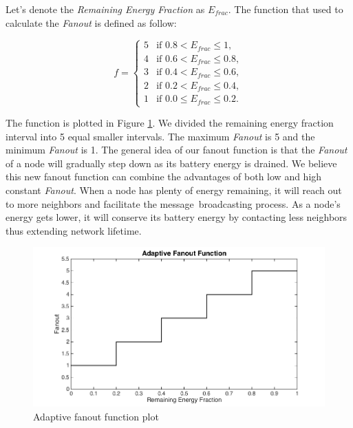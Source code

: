 \documentclass[onehalf,11pt]{beavtex}
\newcommand{\msg}{message}
\begin{document}
Let's denote the \emph{Remaining Energy Fraction} as $E_{frac}$. The function that used to calculate the \emph{Fanout} is defined as follow:

\begin{equation*}
f = \left\{
\begin{array}{rl}
5 & \text{if } 0.8 < E_{frac} \leq 1,\\
4 & \text{if } 0.6 < E_{frac} \leq 0.8,\\
3 & \text{if } 0.4 < E_{frac} \leq 0.6,\\
2 & \text{if } 0.2 < E_{frac} \leq 0.4,\\					
1 & \text{if } 0.0 \leq E_{frac} \leq 0.2.
\end{array} \right.
\end{equation*}

The function is plotted in Figure \ref{fig:step}. We divided the remaining energy fraction interval into 5 equal smaller intervals. The maximum \emph{Fanout} is 5 and the minimum \emph{Fanout} is 1. The general idea of our fanout function is that the \emph{Fanout} of a node will gradually step down as its battery energy is drained. We believe this new fanout function can combine the advantages of both low and high constant \emph{Fanout}. When a node has plenty of energy remaining, it will reach out to more neighbors and facilitate the \msg ~broadcasting process. As a node's energy gets lower, it will conserve its battery energy by contacting less neighbors thus extending network lifetime.


\begin{figure}[h]
	\centering
	\includegraphics[width=5.5in]{stepFunction2.png}
	\caption{Adaptive fanout function plot}
	\label{fig:step}
\end{figure}
\end{document}
